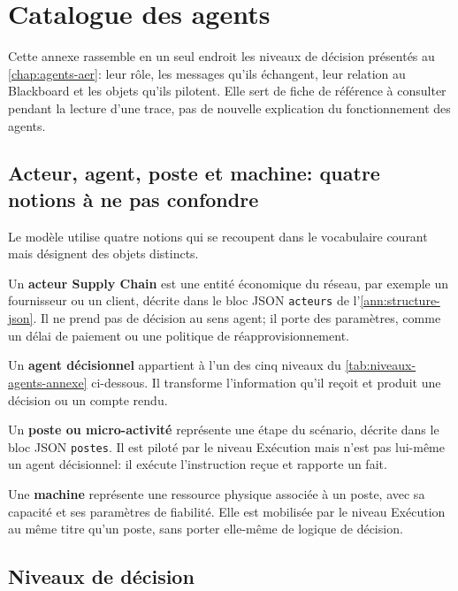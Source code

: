 \chapter{Catalogue des agents}
\label{ann:agents}

Cette annexe rassemble en un seul endroit les niveaux de décision présentés au \cref{chap:agents-aer}: leur rôle, les messages qu'ils échangent, leur relation au Blackboard et les objets qu'ils pilotent. Elle sert de fiche de référence à consulter pendant la lecture d'une trace, pas de nouvelle explication du fonctionnement des agents.


\section{Acteur, agent, poste et machine: quatre notions à ne pas confondre}

Le modèle utilise quatre notions qui se recoupent dans le vocabulaire courant mais désignent des objets distincts.

Un \textbf{acteur Supply Chain} est une entité économique du réseau, par exemple un fournisseur ou un client, décrite dans le bloc JSON \texttt{acteurs} de l'\cref{ann:structure-json}. Il ne prend pas de décision au sens agent; il porte des paramètres, comme un délai de paiement ou une politique de réapprovisionnement.

Un \textbf{agent décisionnel} appartient à l'un des cinq niveaux du \cref{tab:niveaux-agents-annexe} ci-dessous. Il transforme l'information qu'il reçoit et produit une décision ou un compte rendu.

Un \textbf{poste ou micro-activité} représente une étape du scénario, décrite dans le bloc JSON \texttt{postes}. Il est piloté par le niveau Exécution mais n'est pas lui-même un agent décisionnel: il exécute l'instruction reçue et rapporte un fait.

Une \textbf{machine} représente une ressource physique associée à un poste, avec sa capacité et ses paramètres de fiabilité. Elle est mobilisée par le niveau Exécution au même titre qu'un poste, sans porter elle-même de logique de décision.

\section{Niveaux de décision}

